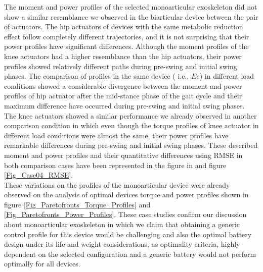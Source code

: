 \documentclass[10pt,letterpaper]{article}
\begin{document}
The moment and power profiles of the selected monoarticular exoskeleton did not show a similar resemblance we observed in the biarticular device between the pair of actuators. The hip actuators of devices with the same metabolic reduction effect follow completely different trajectories, and it is not surprising that their power profiles have significant differences. Although the moment profiles of the knee actuators had a higher resemblance than the hip actuators, their power profiles showed relatively different paths during pre-swing and initial swing phases. The comparison of profiles in the same device ( i.e., $Ee$) in different load conditions showed a considerable divergence between the moment and power profiles of hip actuator after the mid-stance phase of the gait cycle and their maximum difference have occurred during pre-swing and initial swing phases. The knee actuators showed a similar performance we already observed in another comparison condition in which even though the torque profiles of knee actuator in different load conditions were almost the same, their power profiles have remarkable differences during pre-swing and initial swing phases. These described moment and power profiles and their quantitative differences using RMSE in both comparison cases have been represented in the figure in  and figure \ref{Fig_Case04_RMSE}.\\
These variations on the profiles of the monoarticular device were already observed on the analysis of optimal devices torque and power profiles shown in figure \ref{Fig_Paretofronts_Torque_Profiles} and \ref{Fig_Paretofronts_Power_Profiles}. These case studies confirm our discussion about monoarticular exoskeleton in which we claim that obtaining a generic control profile for this device would be challenging and also the optimal battery design under its life and weight considerations, as optimality criteria, highly dependent on the selected configuration and a generic battery would not perform optimally for all devices.
\end{document}

